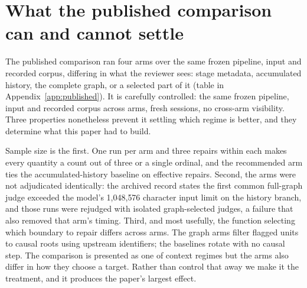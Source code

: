 \section{What the published comparison can and cannot settle}
\label{sec:cannot}



The published comparison ran four arms over the same frozen pipeline, input and recorded
corpus, differing in what the reviewer sees: stage metadata, accumulated history, the
complete graph, or a selected part of it (table in Appendix~\ref{app:published}). It is
carefully controlled: the same frozen pipeline, input
and recorded corpus across arms, fresh sessions, no cross-arm visibility. Three properties
nonetheless prevent it settling which regime is better, and they determine what this paper
had to build.

Sample size is the first. One run per arm and three repairs within each makes every
quantity a count out of three or a single ordinal, and the recommended arm ties the
accumulated-history baseline on effective repairs. Second, the arms were not adjudicated
identically: the archived record states the first common full-graph judge exceeded the
model's 1{,}048{,}576 character input limit on the history branch, and those runs were
rejudged with isolated graph-selected judges, a failure that also removed that arm's
timing. Third, and most usefully, the function selecting which boundary to repair differs
across arms. The graph arms filter flagged units to causal roots using upstream
identifiers; the baselines rotate with no causal step. The comparison is presented as one
of context regimes but the arms also differ in how they choose a target. Rather than
control that away we make it the treatment, and it produces the paper's largest effect.
